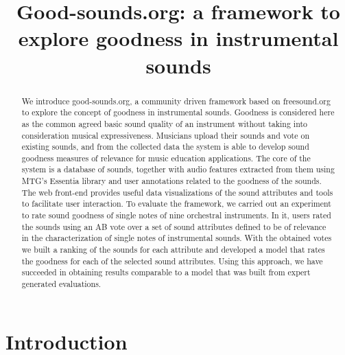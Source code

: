 \documentclass{article}
\title{Good-sounds.org: a framework to explore goodness in instrumental sounds}
\begin{document}
%
\maketitle
%
\begin{abstract}
We introduce good-sounds.org, a community driven framework based on freesound.org to explore the concept of goodness in instrumental sounds. Goodness is consi\-de\-red here as the common agreed basic sound quality of an instrument without taking into consideration musical expressiveness. Musicians upload their sounds and vote on existing sounds, and from the collected data the system is able to develop sound goodness measures of relevance for music education applications. The core of the system is a database of sounds, together with audio features extracted from them using MTG's Essentia library and user annotations related to the goodness of the sounds. The web front-end provides useful data visualizations of the sound attributes and tools to facilitate user interaction. To evaluate the framework, we carried out an experiment to rate sound goodness of single notes of nine orchestral instruments. In it, users rated the sounds using an AB vote over a set of sound attributes defined to be of relevance in the characterization of single notes of instrumental sounds. With the obtained votes we built a ranking of the sounds for each attribute and developed a model that rates the goodness for each of the selected sound attributes. Using this approach, we have succeeded in obtaining results comparable to a model that was built from expert generated evaluations.
\end{abstract}
%
\section{Introduction}\label{sec:introduction}
\end{document}
